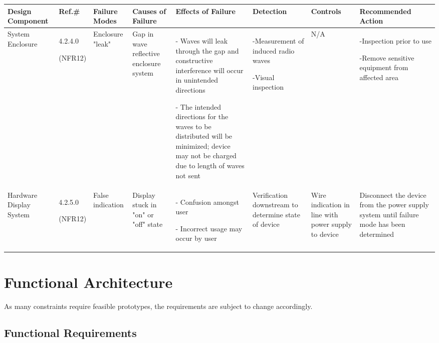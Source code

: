 \documentclass[12pt, titlepage]{article}
\begin{document}
\begin{center}
\begin{adjustwidth}{-3.5cm}{}
\begin{tabular}{|p{1.6cm}|p{1.2cm}|p{1.6cm}|p{2.0cm}|p{3.7cm}|p{2cm}|p{2cm}|p{3.5cm}|}
\hline
Design Component & Ref.\# & Failure Modes & Causes of Failure & Effects of Failure & Detection & Controls & Recommended Action\\
\hline
System Enclosure & 4.2.4.0 \par (NFR12) & Enclosure "leak" & Gap in wave reflective enclosure system & - Waves will leak through the gap and constructive interference will occur in unintended directions \par - The intended directions for the waves to be distributed will be minimized; device may not be charged due to length of waves not sent  & -Measurement of induced radio waves \par -Visual inspection & N/A & -Inspection prior to use \par -Remove sensitive equipment from affected area\\
\hline
Hardware Display System & 4.2.5.0 \par (NFR12) & False indication & Display stuck in "on" or "off" state & - Confusion amongst user \par - Incorrect usage may occur by user & Verification downstream to determine state of device & Wire indication in line with power supply to device & Disconnect the device from the power supply system until failure mode has been determined\\
\hline
\end{tabular}
\end{adjustwidth}
\end{center}

\fancyhf{}
\fancyhead[C]{\thepage}
\renewcommand{\headrulewidth}{0pt}
\pagestyle{plain}


\section{Functional Architecture}
As many constraints require feasible prototypes, the requirements are subject to change accordingly.
\subsection{Functional Requirements}
\end{document}
